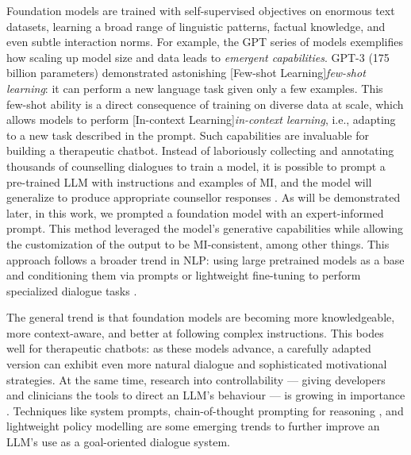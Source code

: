 Foundation models are trained with self-supervised objectives on enormous text datasets, learning a broad range of linguistic patterns, factual knowledge, and even subtle interaction norms. For example, the GPT series of models exemplifies how scaling up model size and data leads to \emph{emergent capabilities}. GPT-3 \cite{brown2020language} (175 billion parameters) demonstrated astonishing [Few-shot Learning]\emph{few-shot learning}: it can perform a new language task given only a few examples. This few-shot ability is a direct consequence of training on diverse data at scale, which allows models to perform [In-context Learning]\emph{in-context learning}, i.e., adapting to a new task described in the prompt. Such capabilities are invaluable for building a therapeutic chatbot. Instead of laboriously collecting and annotating thousands of counselling dialogues to train a model, it is possible to prompt a pre-trained LLM with instructions and examples of MI, and the model will generalize to produce appropriate counsellor responses \cite{xie-etal-2024-shot-dialogue}. As will be demonstrated later, in this work, we prompted a foundation model with an expert-informed prompt. This method leveraged the model's generative capabilities while allowing the customization of the output to be MI-consistent, among other things. This approach follows a broader trend in NLP: using large pretrained models as a base and conditioning them via prompts or lightweight fine-tuning to perform specialized dialogue tasks \cite{10.5555/3600270.3602070}.


The general trend is that foundation models are becoming more knowledgeable, more context-aware, and better at following complex instructions. This bodes well for therapeutic chatbots: as these models advance, a carefully adapted version can exhibit even more natural dialogue and sophisticated motivational strategies. At the same time, research into controllability --- giving developers and clinicians the tools to direct an LLM's behaviour --- is growing in importance \cite{fernandez-etal-2025-lamia}. Techniques like system prompts, chain-of-thought prompting for reasoning \cite{10.5555/3600270.3602070}, and lightweight policy modelling \cite{du-etal-2024-rewarding} are some emerging trends to further improve an LLM's use as a goal-oriented dialogue system.


